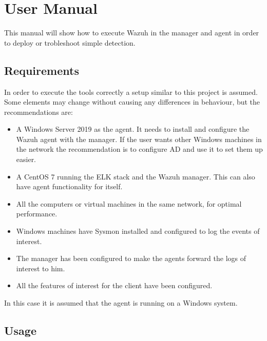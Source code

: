 \chapter{User Manual}
This manual will show how to execute Wazuh in the manager and agent in order to deploy or trobleshoot simple detection.

\section*{Requirements}
In order to execute the tools correctly a setup similar to this project is assumed.
Some elements may change without causing any differences in behaviour, but the recommendations are:
\begin{itemize}
	\item A Windows Server 2019 as the agent. It needs to install and configure the Wazuh agent with the manager. If the user wants other Windows machines in the network the recommendation is to configure AD and use it to set them up easier.
	\item A CentOS 7 running the ELK stack and the Wazuh manager. This can also have agent functionality for itself.
	\item All the computers or virtual machines in the same network, for optimal performance.
	\item Windows machines have Sysmon installed and configured to log the events of interest.
	\item The manager has been configured to make the agents forward the logs of interest to him.
	\item All the features of interest for the client have been configured.
\end{itemize}
\linej
In this case it is assumed that the agent is running on a Windows system.

\section*{Usage}
